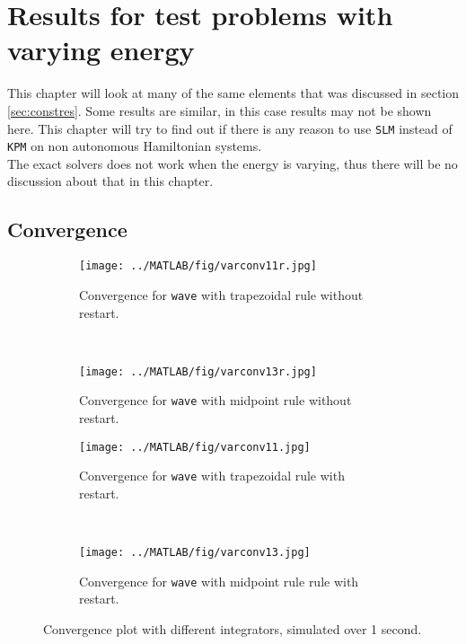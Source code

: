 \chapter{Results for test problems with varying energy}%
\label{sec:varyener} %
This chapter will look at many of the same elements that was discussed in section \ref{sec:constres}. Some results are similar, in this case results may not be shown here. This chapter will try to find out if there is any reason to use \texttt{SLM} instead of \texttt{KPM} on non autonomous Hamiltonian systems. \\
The exact solvers does not work when the energy is varying, thus there will be no discussion about that in this chapter.
\section{Convergence} %
\begin{figure}[H]
        \centering
        
		
		\begin{subfigure}[b]{0.45\textwidth}
                \texttt{[image: ../MATLAB/fig/varconv11r.jpg]}
                \caption{ Convergence for \texttt{wave} with trapezoidal rule without restart. }
                \label{fig:varconv11r}
        \end{subfigure}%
        ~
        \begin{subfigure}[b]{0.45\textwidth}
                \texttt{[image: ../MATLAB/fig/varconv13r.jpg]}
                \caption{ Convergence for \texttt{wave} with midpoint rule without restart. }
                \label{fig:varconv13r}
        \end{subfigure}
        \begin{subfigure}[b]{0.45\textwidth}
                \texttt{[image: ../MATLAB/fig/varconv11.jpg]}
                \caption{ Convergence for \texttt{wave} with trapezoidal rule with restart. }
                \label{fig:varconv11}
        \end{subfigure}%
        ~
        \begin{subfigure}[b]{0.45\textwidth}
                \texttt{[image: ../MATLAB/fig/varconv13.jpg]}
                \caption{ Convergence for \texttt{wave} with midpoint rule rule with restart. }
                \label{fig:varconv13}
        \end{subfigure}

        \caption{ Convergence plot with different integrators, simulated over 1 second. }
        \label{fig:varconv}
\end{figure}

